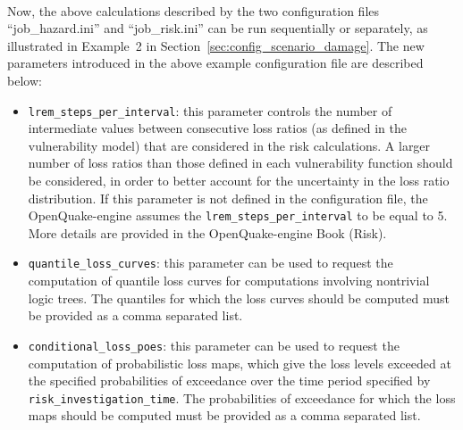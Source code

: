 \inputminted[firstline=1,firstnumber=1,fontsize=\footnotesize,frame=single,linenos,bgcolor=lightgray,label=job\_risk.ini]{ini}{oqum/risk/verbatim/config_classical_risk.ini}\\

Now, the above calculations described by the two configuration files
``job\_hazard.ini'' and ``job\_risk.ini'' can be run sequentially or
separately, as illustrated in Example~2 in
Section~\ref{sec:config_scenario_damage}. The new parameters introduced in the
above example configuration file are described below:

\begin{itemize}

	\item \Verb+lrem_steps_per_interval+: this parameter controls the number of
	  intermediate values between consecutive loss ratios (as defined in the 
	  \gls{vulnerability model}) that are considered in the risk calculations.
	  A larger number of loss ratios than those defined in each
	  \gls{vulnerability function} should be considered, in order to better
	  account for the uncertainty in the loss ratio distribution. If this
	  parameter is not defined in the configuration file, the OpenQuake-engine
	  assumes the \Verb+lrem_steps_per_interval+ to be equal to 5. More details
	  are provided in the OpenQuake-engine Book (Risk).

	\item \Verb+quantile_loss_curves+: this parameter can be used to request
	  the computation of quantile loss curves for computations involving
	  nontrivial logic trees. The quantiles for which the loss curves should
	  be computed must be provided as a comma separated list.

	\item \Verb+conditional_loss_poes+: this parameter can be used to request
	  the computation of probabilistic loss maps, which give the loss levels
	  exceeded at the specified probabilities of exceedance over the time
	  period specified by \Verb+risk_investigation_time+. The probabilities of
	  exceedance for which the loss maps should be computed must be provided as
	  a comma separated list.

\end{itemize}